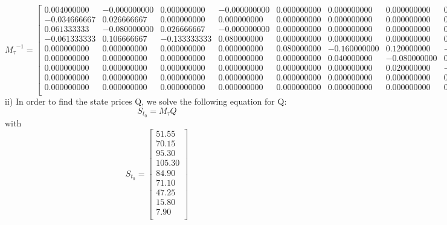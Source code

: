 \documentclass{article}
\begin{document}
\begin{equation}
{M_{\tau}}^{-1}=%
\begin{bmatrix}{}
  0.004000000 & -0.000000000 & 0.000000000 & -0.000000000 & 0.000000000 & 0.000000000 & 0.000000000 & 0.000000000 & 0.000000000 \\ 
  -0.034666667 & 0.026666667 & 0.000000000 & 0.000000000 & 0.000000000 & 0.000000000 & 0.000000000 & 0.000000000 & 0.000000000 \\ 
  0.061333333 & -0.080000000 & 0.026666667 & -0.000000000 & 0.000000000 & 0.000000000 & 0.000000000 & 0.000000000 & 0.000000000 \\ 
  -0.061333333 & 0.106666667 & -0.133333333 & 0.080000000 & 0.000000000 & 0.000000000 & 0.000000000 & 0.000000000 & 0.000000000 \\ 
  0.000000000 & 0.000000000 & 0.000000000 & 0.000000000 & 0.080000000 & -0.160000000 & 0.120000000 & -0.120000000 & 0.106666667 \\ 
  0.000000000 & 0.000000000 & 0.000000000 & 0.000000000 & 0.000000000 & 0.040000000 & -0.080000000 & 0.120000000 & -0.106666667 \\ 
  0.000000000 & 0.000000000 & 0.000000000 & 0.000000000 & 0.000000000 & 0.000000000 & 0.020000000 & -0.100000000 & 0.106666667 \\ 
  0.000000000 & 0.000000000 & 0.000000000 & 0.000000000 & 0.000000000 & 0.000000000 & 0.000000000 & 0.040000000 & -0.066666667 \\ 
  0.000000000 & 0.000000000 & 0.000000000 & 0.000000000 & 0.000000000 & 0.000000000 & 0.000000000 & 0.000000000 & 0.013333333 \\ 
  \end{bmatrix}
\end{equation}
ii) In order to find the state prices Q, we solve the following equation for Q:
\begin{equation*}
S_{t_{0}} = M_{\tau}Q 
\end{equation*}
with
\begin{equation*}
S_{t_{0}} = %
\begin{bmatrix}{}
 51.55 \\ 
  70.15 \\ 
  95.30 \\ 
  105.30 \\ 
  84.90 \\ 
  71.10 \\ 
  47.25 \\ 
  15.80 \\ 
  7.90 \\ 
  \end{bmatrix}
\end{equation*}
\end{document}
